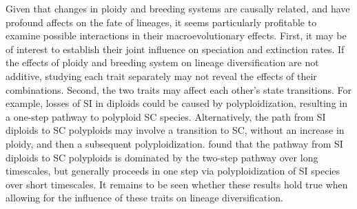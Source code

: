 Given that changes in ploidy and breeding systems are causally related, and have profound affects on the fate of lineages, it seems particularly profitable to examine possible interactions in their macroevolutionary effects.
First, it may be of interest to establish their joint influence on speciation and extinction rates.
If the effects of ploidy and breeding system on lineage diversification are not additive, studying each trait separately may not reveal the effects of their combinations.
Second, the two traits may affect each other's state transitions.
For example, losses of SI in diploids could be caused by polyploidization, resulting in a one-step pathway to polyploid SC species. 
Alternatively, the path from SI diploids to SC polyploids may involve a transition to SC, without an increase in ploidy, and then a subsequent polyploidization. 
\citet{robertson_2011} found that the pathway from SI diploids to SC polyploids is dominated by the two-step pathway over long timescales, but generally proceeds in one step via polyploidization of SI species over short timescales.
It remains to be seen whether these results hold true when allowing for the influence of these traits on lineage diversification.

